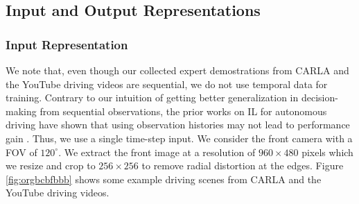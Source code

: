 \documentclass[letterpaper, 12pt]{book}
\theoremstyle{definition}
\theoremstyle{definition}
\theoremstyle{definition}
\theoremstyle{definition}
\theoremstyle{definition}
\begin{document}
\subsection{Input and Output Representations}
\label{sec:org9b13cb9}

\subsubsection{Input Representation}
\label{sec:orgcfa2320}

\label{sec:orgbe4fb75}
We note that, even though our collected expert demostrations from CARLA and the
YouTube driving videos are sequential, we do not use temporal data for
training. Contrary to our intuition of getting better generalization in
decision-making from sequential observations, the prior works on IL for
autonomous driving have shown that using observation histories may not lead to
performance gain \cite{Haan2019,Muller2006,Bansal2018,Wang2019a}. Thus, we use a
single time-step input. We consider the front camera with a FOV of
\(120^{\circ}\). We extract the front image at a resolution of \(960 \times 480\)
pixels which we resize and crop to \(256 \times 256\) to remove radial distortion at
the edges. Figure \ref{fig:orgbcbfbbb} shows some example driving scenes from CARLA
and the YouTube driving videos.
\end{document}
